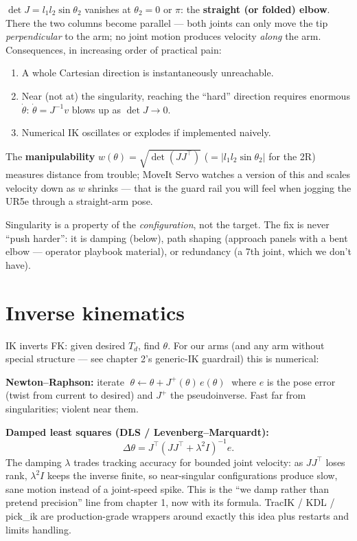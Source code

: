 $\det J = l_1 l_2 \sin\theta_2$ vanishes at $\theta_2 = 0$ or $\pi$: the \textbf{straight (or
folded) elbow}. There the two columns become parallel --- both joints can only move the tip
\emph{perpendicular} to the arm; no joint motion produces velocity \emph{along} the arm.
Consequences, in increasing order of practical pain:
\begin{enumerate}
  \item A whole Cartesian direction is instantaneously unreachable.
  \item Near (not at) the singularity, reaching the ``hard'' direction requires enormous
  $\dot\theta$: $\dot\theta = J^{-1}v$ blows up as $\det J \to 0$.
  \item Numerical IK oscillates or explodes if implemented naively.
\end{enumerate}
The \textbf{manipulability} $w(\theta) = \sqrt{\det(JJ^\top)}$ ($= |l_1 l_2 \sin\theta_2|$ for
the 2R) measures distance from trouble; MoveIt Servo watches a version of this and scales
velocity down as $w$ shrinks --- that is the guard rail you will feel when jogging the UR5e
through a straight-arm pose.

\begin{keyresult}
Singularity is a property of the \emph{configuration}, not the target. The fix is never
``push harder'': it is damping (below), path shaping (approach panels with a bent elbow ---
operator playbook material), or redundancy (a 7th joint, which we don't have).
\end{keyresult}

\section{Inverse kinematics}

IK inverts FK: given desired $T_d$, find $\theta$. For our arms (and any arm without special
structure --- see chapter 2's generic-IK guardrail) this is numerical:

\textbf{Newton--Raphson:} iterate
$\;\theta \leftarrow \theta + J^{+}(\theta)\, e(\theta)\;$ where $e$ is the pose error (twist
from current to desired) and $J^+$ the pseudoinverse. Fast far from singularities; violent
near them.

\textbf{Damped least squares (DLS / Levenberg--Marquardt):}
\begin{equation}
  \Delta\theta = J^\top\!\left(JJ^\top + \lambda^2 I\right)^{-1} e .
  \label{eq:dls}
\end{equation}
The damping $\lambda$ trades tracking accuracy for bounded joint velocity: as $JJ^\top$ loses
rank, $\lambda^2 I$ keeps the inverse finite, so near-singular configurations produce slow,
sane motion instead of a joint-speed spike. This is the ``we damp rather than pretend
precision'' line from chapter 1, now with its formula. TracIK / KDL / pick\_ik are
production-grade wrappers around exactly this idea plus restarts and limits handling.

